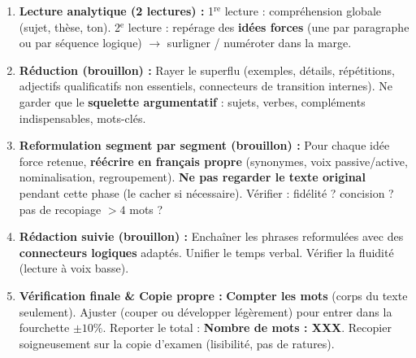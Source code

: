 \documentclass[11pt]{article}
\begin{document}
\begin{methode}
\begin{enumerate}
    \item \textbf{Lecture analytique (2 lectures) :} 1$^{\text{re}}$ lecture : compréhension globale (sujet, thèse, ton). 2$^{\text{e}}$ lecture : repérage des \textbf{idées forces} (une par paragraphe ou par séquence logique) $\rightarrow$ surligner / numéroter dans la marge.
    \item \textbf{Réduction (brouillon) :} Rayer le superflu (exemples, détails, répétitions, adjectifs qualificatifs non essentiels, connecteurs de transition internes). Ne garder que le \textbf{squelette argumentatif} : sujets, verbes, compléments indispensables, mots-clés.
    \item \textbf{Reformulation segment par segment (brouillon) :} Pour chaque idée force retenue, \textbf{réécrire en français propre} (synonymes, voix passive/active, nominalisation, regroupement). \textbf{Ne pas regarder le texte original} pendant cette phase (le cacher si nécessaire). Vérifier : fidélité ? concision ? pas de recopiage $> 4$ mots ?
    \item \textbf{Rédaction suivie (brouillon) :} Enchaîner les phrases reformulées avec des \textbf{connecteurs logiques} adaptés. Unifier le temps verbal. Vérifier la fluidité (lecture à voix basse).
    \item \textbf{Vérification finale \& Copie propre :} \textbf{Compter les mots} (corps du texte seulement). Ajuster (couper ou développer légèrement) pour entrer dans la fourchette $\pm 10\%$. Reporter le total : \textbf{Nombre de mots : XXX}. Recopier soigneusement sur la copie d'examen (lisibilité, pas de ratures).
\end{enumerate}
\end{methode}
\end{document}
